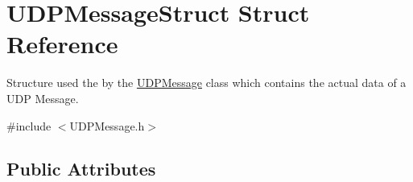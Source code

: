 \hypertarget{struct_u_d_p_message_struct}{}\section{U\+D\+P\+Message\+Struct Struct Reference}
\label{struct_u_d_p_message_struct}


Structure used the by the \hyperlink{class_u_d_p_message}{U\+D\+P\+Message} class which contains the actual data of a U\+DP Message.  




{\ttfamily \#include $<$U\+D\+P\+Message.\+h$>$}

\subsection*{Public Attributes}
